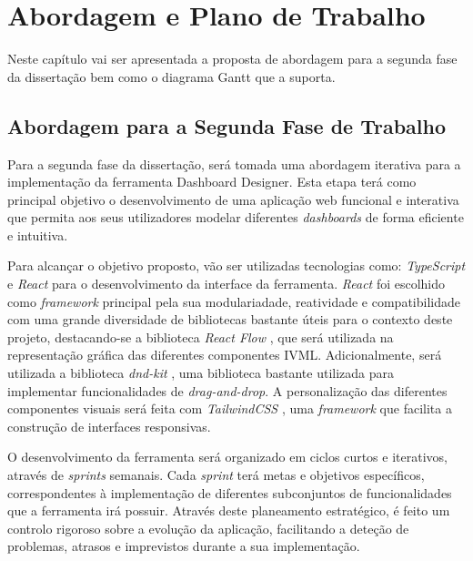 
%

\chapter{Abordagem e Plano de Trabalho}
\label{cha:plano_trabalho}

Neste capítulo vai ser apresentada a proposta de abordagem para a segunda fase da dissertação bem como o diagrama Gantt que a suporta. 

\section{Abordagem para a Segunda Fase de Trabalho} %
\label{sec:abordagem}

Para a segunda fase da dissertação, será tomada uma abordagem iterativa para a implementação da ferramenta Dashboard Designer. Esta etapa terá como principal objetivo o desenvolvimento de uma aplicação web funcional e interativa que permita aos seus utilizadores modelar diferentes \textit{dashboards} de forma eficiente e intuitiva.

Para alcançar o objetivo proposto, vão ser utilizadas tecnologias como: \textit{TypeScript} \cite{typescript} e \textit{React} \cite{react} para o desenvolvimento da interface da ferramenta. \textit{React} foi escolhido como \textit{framework} principal pela sua modulariadade, reatividade e compatibilidade com uma grande diversidade de bibliotecas bastante úteis para o contexto deste projeto, destacando-se a biblioteca \textit{React Flow} \cite{reactflow}, que será utilizada na representação gráfica das diferentes componentes \gls{IVML}. Adicionalmente, será utilizada a biblioteca \textit{dnd-kit} \cite{dndkit}, uma biblioteca bastante utilizada para implementar funcionalidades de \textit{drag-and-drop}. A personalização das diferentes componentes visuais será feita com \textit{TailwindCSS} \cite{tailwindcss}, uma \textit{framework} que facilita a construção de interfaces responsivas.

O desenvolvimento da ferramenta será organizado em ciclos curtos e iterativos, através de \textit{sprints} semanais. Cada \textit{sprint} terá metas e objetivos específicos, correspondentes à implementação de diferentes subconjuntos de funcionalidades que a ferramenta irá possuir. Através deste planeamento estratégico, é feito um controlo rigoroso sobre a evolução da aplicação, facilitando a deteção de problemas, atrasos e imprevistos durante a sua implementação.

